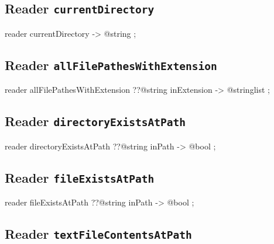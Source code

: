 \subsection{Reader \texttt{currentDirectory}}

\begin{galgascode}
reader currentDirectory -> @string ;
\end{galgascode}








\subsection{Reader \texttt{allFilePathesWithExtension}}

\begin{galgascode}
reader allFilePathesWithExtension ??@string inExtension -> @stringlist ;
\end{galgascode}










\subsection{Reader \texttt{directoryExistsAtPath}}

\begin{galgascode}
reader directoryExistsAtPath ??@string inPath -> @bool ;
\end{galgascode}










\subsection{Reader \texttt{fileExistsAtPath}}

\begin{galgascode}
reader fileExistsAtPath ??@string inPath -> @bool ;
\end{galgascode}










\subsection{Reader \texttt{textFileContentsAtPath}}

